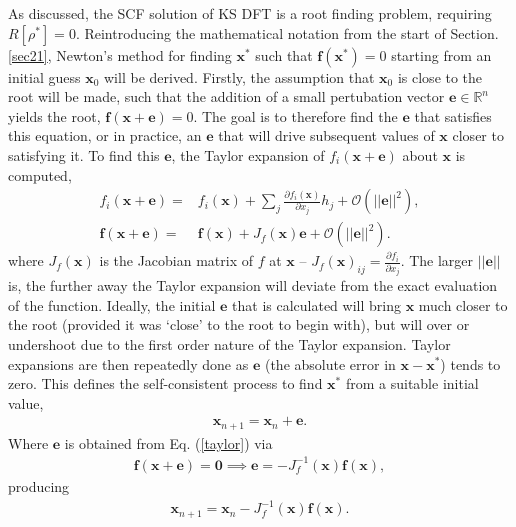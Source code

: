 As discussed, the SCF solution of KS DFT is a root finding problem, requiring $R[\rho^*]=0$. Reintroducing the mathematical notation from the start of Section$.$ \ref{sec21}, Newton's method for finding $\textbf{x}^*$ such that $\textbf{f}(\textbf{x}^*) = 0$ starting from an initial guess $\textbf{x}_0$ will be derived. Firstly, the assumption that $\textbf{x}_0$ is close to the root will be made, such that the addition of a small pertubation vector $\textbf{e} \in \mathbb{R}^n$ yields the root, $\textbf{f}({\textbf{x} + \textbf{e}}) = 0$. The goal is to therefore find the $\textbf{e}$ that satisfies this equation, or in practice, an $\textbf{e}$ that will drive subsequent values of $\textbf{x}$ closer to satisfying it. To find this $\textbf{e}$, the Taylor expansion of $f_i(\textbf{x}+\textbf{e})$ about $\textbf{x}$ is computed,
\begin{align}
f_i(\textbf{x}+\textbf{e}) =& f_i(\textbf{x}) + \sum_j \frac{\partial f_i( \textbf{x})}{\partial x_j} h_j + \mathcal{O}(||\textbf{e}||^2), \\ \label{taylor}
\textbf{f}(\textbf{x}+\textbf{e}) =& \textbf{f}(\textbf{x}) + J_f(\textbf{x}) \textbf{e} + \mathcal{O}(||\textbf{e}||^2).
\end{align}
where $J_f(\textbf{x})$ is the Jacobian matrix of $f$ at $\textbf{x}$ -- $J_f(\textbf{x})_{ij} = \frac{\partial f_i}{\partial x_j}$. The larger $||\textbf{e}||$ is, the further away the Taylor expansion will deviate from the exact evaluation of the function. Ideally, the initial $\textbf{e}$ that is calculated will bring $\textbf{x}$ much closer to the root (provided it was `close' to the root to begin with), but will over or undershoot due to the first order nature of the Taylor expansion. Taylor expansions are then repeatedly done as $\textbf{e}$ (the absolute error in $\textbf{x} - \textbf{x}^*$) tends to zero. This defines the self-consistent process to find  $\textbf{x}^*$ from a suitable initial value,
\begin{align}
\textbf{x}_{n+1} = \textbf{x}_{n} + \textbf{e}.
\end{align} 
Where $\textbf{e}$ is obtained from Eq$.$ (\ref{taylor}) via
\begin{gather}
\textbf{f}(\textbf{x}+\textbf{e}) = \textbf{0} \implies \textbf{e} = -J^{-1}_f(\textbf{x})\textbf{f}(\textbf{x}),
\end{gather}  
producing
\begin{align}
\textbf{x}_{n+1} = \textbf{x}_{n} -J^{-1}_f(\textbf{x})\textbf{f}(\textbf{x}).
\end{align}
